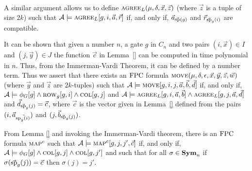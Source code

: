 \documentclass[../paper.tex]{subfiles}
\begin{document}
A similar argument allows us to define $\textsc{agree}_L (\mu, \delta , \vec{x}, \vec{z})$ (where $\vec{z}$ is a tuple of size $2k$) such that $\mathcal{A} \models \textsc{agree}_L [g, i, \vec{a}, \vec{r}]$ if, and only if, $\vec{a}_{\vec{\text{sp}}(g)}$ and $\vec{r}_{\vec{\text{sp}}_g(i)}$ are compatible.

It can be shown that given a number $n$, a gate $g$ in $C_n$ and two pairs $(i, \vec{x}) \in I$ and $(j, \vec{y}) \in J$ the function $\vec{c}$ in Lemma~\ref{} can be computed in time polynomial in $n$. Thus, from the Immerman-Vardi Theorem, it can be defined by a number term. Thus we assert that there exists an $\text{\upshape FPC}$ formula $\textsc{move} (\mu, \delta, \epsilon, \vec{x}, \vec{y}, \vec{z},
\vec{w})$ (where $\vec{y}$ and $\vec{z}$ are $2k$-tuples) such that $\mathcal{A} \models \textsc{move} [g, i, j, \vec{a}, \vec{b}, \vec{d}]$ if, and only if, $\mathcal{A} \models \phi_G [g] \land \textsc{row}_g[g,i] \land \textsc{col}[g, j]$ and $\mathcal{A} \models \textsc{agree}_L [g, i, \vec{a}, \vec{b}] \land \textsc{agree}_L [g, j, \vec{a}, \vec{d}]$ and $\vec{d}_{\vec{\text{sp}}_g(j)} = \vec{c}$, where $\vec{c}$ is the vector given in Lemma~\ref{} defined from the pairs $(i, \vec{a}_{\vec{\text{sp}_g(i)}})$ and $(j, \vec{b}_{\vec{\text{sp}}_g(j)})$.

From Lemma \ref{} and invoking the Immerman-Vardi theorem, there is an $\text{\upshape FPC}$
formula $\textsc{map}^c$ such that $\mathcal{A} \models \textsc{map}^c[g, j, j',
\vec{c}]$ if, and only if, $\mathcal{A} \models \phi_G [g] \land \textsc{col}[g, j]
\land \textsc{col}[g, j']$ and such that for all $\sigma \in \text{\textbf{Sym}}_n$ if $\sigma
(\vec{\text{sp}}_g(j)) = \vec{c}$ then $\sigma (j) = j'$.
				
				
\end{document}
